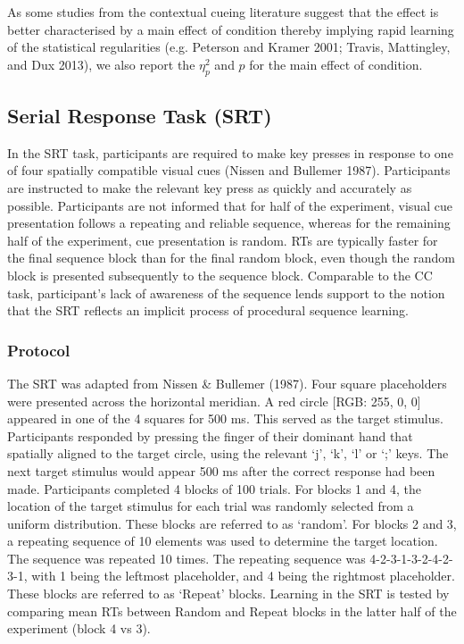 \documentclass{article}
\begin{document}
As some studies from the contextual cueing literature suggest that the effect is better characterised by a main effect of condition thereby implying rapid learning of the statistical regularities (e.g. Peterson and Kramer 2001; Travis, Mattingley, and Dux 2013), we also report the \(\eta_{p}^2\) and \(p\) for the main effect of condition.

\hypertarget{serial-response-task-srt}{%
\subsection{Serial Response Task (SRT)}\label{serial-response-task-srt}}

\label{sec:SRTMeth}

In the SRT task, participants are required to make key presses in response to one of four spatially compatible visual cues (Nissen and Bullemer 1987). Participants are instructed to make the relevant key press as quickly and accurately as possible. Participants are not informed that for half of the experiment, visual cue presentation follows a repeating and reliable sequence, whereas for the remaining half of the experiment, cue presentation is random. RTs are typically faster for the final sequence block than for the final random block, even though the random block is presented subsequently to the sequence block. Comparable to the CC task, participant's lack of awareness of the sequence lends support to the notion that the SRT reflects an implicit process of procedural sequence learning.

\hypertarget{protocol-3}{%
\subsubsection{Protocol}\label{protocol-3}}

The SRT was adapted from Nissen \& Bullemer (1987). Four square placeholders were presented across the horizontal meridian. A red circle {[}RGB: 255, 0, 0{]} appeared in one of the 4 squares for 500 ms. This served as the target stimulus. Participants responded by pressing the finger of their dominant hand that spatially aligned to the target circle, using the relevant `j', `k', `l' or `;' keys. The next target stimulus would appear 500 ms after the correct response had been made. Participants completed 4 blocks of 100 trials. For blocks 1 and 4, the location of the target stimulus for each trial was randomly selected from a uniform distribution. These blocks are referred to as `random'. For blocks 2 and 3, a repeating sequence of 10 elements was used to determine the target location. The sequence was repeated 10 times. The repeating sequence was 4-2-3-1-3-2-4-2-3-1, with 1 being the leftmost placeholder, and 4 being the rightmost placeholder. These blocks are referred to as `Repeat' blocks. Learning in the SRT is tested by comparing mean RTs between Random and Repeat blocks in the latter half of the experiment (block 4 vs 3).
\end{document}
